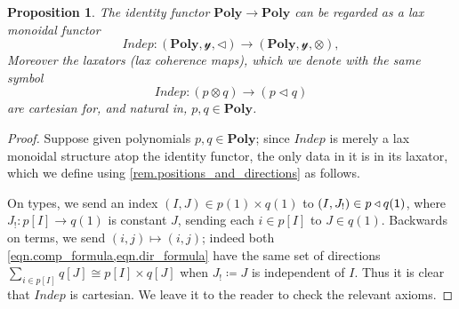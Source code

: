 \documentclass[11pt, one side, article]{memoir}
\theoremstyle{definition}
\theoremstyle{plain}
\newtheorem{proposition}[definitionx]{Proposition}
\newcommand{\Cat}[1]{\mathbf{#1}}%
\newcommand{\Fun}[1]{\mathit{#1}}%
\newcommand{\yon}{\mathcal{y}}
\newcommand{\poly}{\Cat{Poly}}
\newcommand{\0}{\textsf{0}}
\newcommand{\1}{\tn{\textsf{1}}}
\newcommand{\tri}{\mathbin{\triangleleft}}
\newcommand{\indep}{\Fun{Indep}}
\begin{document}
\begin{proposition}\label{prop.indep}
The identity functor $\poly\to\poly$ can be regarded as a lax monoidal functor
\begin{equation}\label{eqn.indep}
	\indep\colon (\poly,\yon,\tri)\to(\poly,\yon,\otimes),
\end{equation}
Moreover the laxators (lax coherence maps), which we denote with the same symbol
\[\indep\colon (p\otimes q)\to (p\tri q)\]
are cartesian for, and natural in, $p,q\in\poly$.
\end{proposition}
\begin{proof}
Suppose given polynomials $p,q\in\poly$; since $\indep$ is merely a lax monoidal structure atop the identity functor, the only data in it is in its laxator, which we define using \cref{rem.positions_and_directions} as follows.

On types, we send an index $(I,J)\in p(1)\times q(1)$ to $(I,J_!)\in p\tri q(\1)$, where $J_!\colon p[I]\to q(1)$ is constant $J$, sending each $i\in p[I]$ to $J\in q(1)$. Backwards on terms, we send $(i,j)\mapsto (i,j)$; indeed both \cref{eqn.comp_formula,eqn.dir_formula} have the same set of directions $\sum_{i\in p[I]}q[J]\cong p[I]\times q[J]$ when $J_!\coloneqq J$ is independent of $I$. Thus it is clear that $\indep$ is cartesian. We leave it to the reader to check the relevant axioms.
\end{proof}
\end{document}
